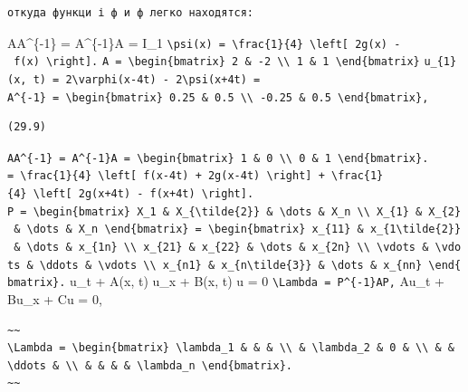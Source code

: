 \documentclass[
  ukrainian,
]{article}
\begin{document}
\begin{verbatim}
откуда функци і ф и ф легко находятся:
\end{verbatim}

AA\^{}\{-1\} = A\^{}\{-1\}A = I\_1
\texttt{\textbackslash{}psi(x)\ =\ \textbackslash{}frac\{1\}\{4\}\ \textbackslash{}left{[}\ 2g(x)\ -\ f(x)\ \textbackslash{}right{]}.}
\texttt{A\ =\ \textbackslash{}begin\{bmatrix\}\ 2\ \&\ -2\ \textbackslash{}\textbackslash{}\ 1\ \&\ 1\ \textbackslash{}end\{bmatrix\}}
\texttt{u\_\{1\}(x,\ t)\ =\ 2\textbackslash{}varphi(x-4t)\ -\ 2\textbackslash{}psi(x+4t)\ =}
\texttt{A\^{}\{-1\}\ =\ \textbackslash{}begin\{bmatrix\}\ 0.25\ \&\ 0.5\ \textbackslash{}\textbackslash{}\ -0.25\ \&\ 0.5\ \textbackslash{}end\{bmatrix\},}

\begin{verbatim}
(29.9)
\end{verbatim}

\texttt{AA\^{}\{-1\}\ =\ A\^{}\{-1\}A\ =\ \textbackslash{}begin\{bmatrix\}\ 1\ \&\ 0\ \textbackslash{}\textbackslash{}\ 0\ \&\ 1\ \textbackslash{}end\{bmatrix\}.}
\texttt{=\ \textbackslash{}frac\{1\}\{4\}\ \textbackslash{}left{[}\ f(x-4t)\ +\ 2g(x-4t)\ \textbackslash{}right{]}\ +\ \textbackslash{}frac\{1\}\{4\}\ \textbackslash{}left{[}\ 2g(x+4t)\ -\ f(x+4t)\ \textbackslash{}right{]}.}
\texttt{P\ =\ \textbackslash{}begin\{bmatrix\}\ X\_1\ \&\ X\_\{\textbackslash{}tilde\{2\}\}\ \&\ \textbackslash{}dots\ \&\ X\_n\ \textbackslash{}\textbackslash{}\ X\_\{1\}\ \&\ X\_\{2\}\ \&\ \textbackslash{}dots\ \&\ X\_n\ \textbackslash{}end\{bmatrix\}\ =\ \textbackslash{}begin\{bmatrix\}\ x\_\{11\}\ \&\ x\_\{1\textbackslash{}tilde\{2\}\}\ \&\ \textbackslash{}dots\ \&\ x\_\{1n\}\ \textbackslash{}\textbackslash{}\ x\_\{21\}\ \&\ x\_\{22\}\ \&\ \textbackslash{}dots\ \&\ x\_\{2n\}\ \textbackslash{}\textbackslash{}\ \textbackslash{}vdots\ \&\ \textbackslash{}vdots\ \&\ \textbackslash{}ddots\ \&\ \textbackslash{}vdots\ \textbackslash{}\textbackslash{}\ x\_\{n1\}\ \&\ x\_\{n\textbackslash{}tilde\{3\}\}\ \&\ \textbackslash{}dots\ \&\ x\_\{nn\}\ \textbackslash{}end\{bmatrix\}.}
u\_t + A(x, t) u\_x + B(x, t) u = 0
\texttt{\textbackslash{}Lambda\ =\ P\^{}\{-1\}AP,} Au\_t + Bu\_x + Cu =
0,

\begin{verbatim}
~~
\Lambda = \begin{bmatrix} \lambda_1 & & & \\ & \lambda_2 & 0 & \\ & & \ddots & \\ & & & & \lambda_n \end{bmatrix}.
~~
\end{verbatim}
\end{document}
